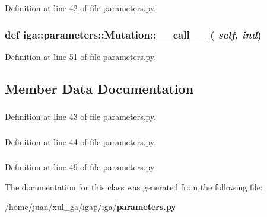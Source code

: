 Definition at line 42 of file parameters.py.
\subsubsection{\setlength{\rightskip}{0pt plus 5cm}def iga::parameters::Mutation::\_\-\_\-call\_\-\_\- ( {\em self},  {\em ind})}\label{classiga_1_1parameters_1_1Mutation_63bda169fa23bf3b940dcfac79f42258}




Definition at line 51 of file parameters.py.

\subsection{Member Data Documentation}
\subsubsection{}\label{classiga_1_1parameters_1_1Mutation_a6f6477b5797b5c7c52d9ed17eaba054}




Definition at line 43 of file parameters.py.
\subsubsection{}\label{classiga_1_1parameters_1_1Mutation_ffa6a563e64f6acf7b03c88a4f8ef64d}




Definition at line 44 of file parameters.py.
\subsubsection{\hspace{0.3cm}{\tt  [private]}}\label{classiga_1_1parameters_1_1Mutation_8a29c884812e3e3cb0047dfdb37ff66f}




Definition at line 49 of file parameters.py.

The documentation for this class was generated from the following file:\begin{CompactItemize}
\item 
/home/juan/xul\_\-ga/igap/iga/{\bf parameters.py}\end{CompactItemize}
